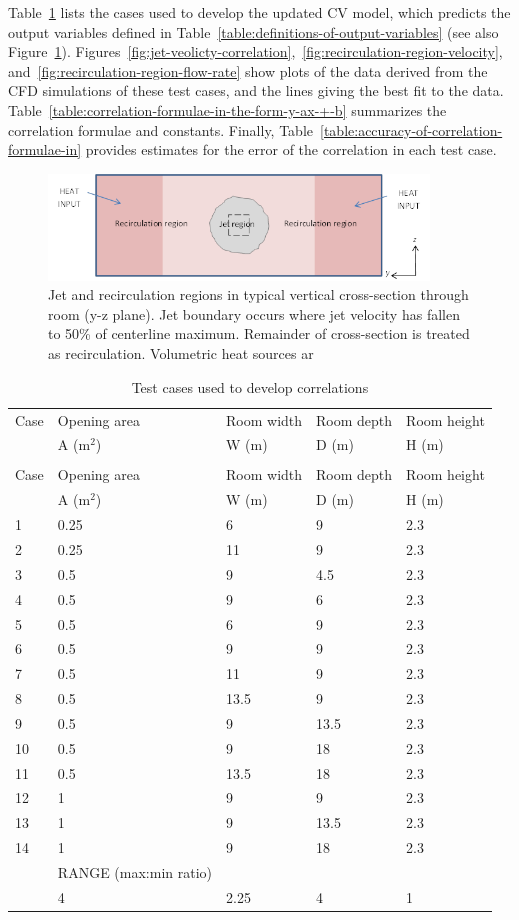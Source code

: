 {Table~\ref{table:test-cases-used-to-develop-correlations} lists the cases used to develop the updated CV model, which predicts the output variables defined in Table~\ref{table:definitions-of-output-variables} (see also Figure~\ref{fig:jet-and-recirculation-regions-in-typical}). Figures~\ref{fig:jet-veolicty-correlation},~\ref{fig:recirculation-region-velocity}, and~\ref{fig:recirculation-region-flow-rate} show plots of the data derived from the CFD simulations of these test cases, and the lines giving the best fit to the data. Table~\ref{table:correlation-formulae-in-the-form-y-ax-+-b} summarizes the correlation formulae and constants. Finally, Table~\ref{table:accuracy-of-correlation-formulae-in} provides estimates for the error of the correlation in each test case.

\begin{figure}[hbtp] %
\centering
\includegraphics[width=0.9\textwidth, height=0.9\textheight, keepaspectratio=true]{media/image2634.png}
\caption{Jet and recirculation regions in typical vertical cross-section through room (y-z plane). Jet boundary occurs where jet velocity has fallen to 50\% of centerline maximum. Remainder of cross-section is treated as recirculation. Volumetric heat sources ar \protect \label{fig:jet-and-recirculation-regions-in-typical}}
\end{figure}

\begin{longtable}[c]{@{}lllll@{}}
\caption{Test cases used to develop correlations \label{table:test-cases-used-to-develop-correlations}} \tabularnewline
\toprule 
Case & Opening area & Room width & Room depth & Room height \tabularnewline
  & A (m\(^2\)) & W (m) & D (m) & H (m) \tabularnewline

\midrule
\endfirsthead

\caption[]{Test cases used to develop correlations} \tabularnewline
\toprule 
Case & Opening area & Room width & Room depth & Room height \tabularnewline
  & A (m\(^2\)) & W (m) & D (m) & H (m) \tabularnewline

\midrule
\endhead

1 & 0.25 & 6 & 9 & 2.3 \tabularnewline
2 & 0.25 & 11 & 9 & 2.3 \tabularnewline
3 & 0.5 & 9 & 4.5 & 2.3 \tabularnewline
4 & 0.5 & 9 & 6 & 2.3 \tabularnewline
5 & 0.5 & 6 & 9 & 2.3 \tabularnewline
6 & 0.5 & 9 & 9 & 2.3 \tabularnewline
7 & 0.5 & 11 & 9 & 2.3 \tabularnewline
8 & 0.5 & 13.5 & 9 & 2.3 \tabularnewline
9 & 0.5 & 9 & 13.5 & 2.3 \tabularnewline
10 & 0.5 & 9 & 18 & 2.3 \tabularnewline
11 & 0.5 & 13.5 & 18 & 2.3 \tabularnewline
12 & 1 & 9 & 9 & 2.3 \tabularnewline
13 & 1 & 9 & 13.5 & 2.3 \tabularnewline
14 & 1 & 9 & 18 & 2.3 \tabularnewline
   & RANGE (max:min ratio) \tabularnewline
 & 4 & 2.25 & 4 & 1 \tabularnewline
\bottomrule
\end{longtable}

}
